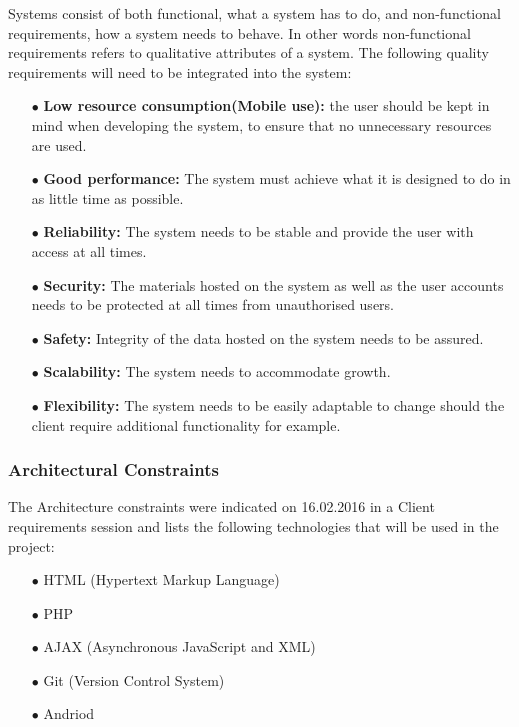 \documentclass[a4paper,12pt]{article}
\begin{document}
\begin{flushleft}
Systems consist of both functional, what a system has to do, and non-functional requirements, how a system needs to behave. In other words non-functional requirements refers to qualitative attributes of a system. The following quality requirements will need to be integrated into the system:
\begin{itemize}
	\item[$\bullet$]\textbf{Low resource consumption(Mobile use): } the user should be kept in mind when developing the system, to ensure that no unnecessary resources are used.
	\item[$\bullet$]\textbf{Good performance: }The system must achieve what it is designed to do in as little time as possible.
	\item[$\bullet$]\textbf{Reliability: }The system needs to be stable and provide the user with access at all times.
	\item[$\bullet$]\textbf{Security: }The materials hosted on the system as well as the user accounts needs to be protected at all times from unauthorised users.
	\item[$\bullet$]\textbf{Safety: }Integrity of the data hosted on the system needs to be assured.
	\item[$\bullet$]\textbf{Scalability: }The system needs to accommodate growth.
	\item[$\bullet$]\textbf{Flexibility: }The system needs to be easily adaptable to change should the client require additional functionality for example.
\end{itemize}
\end{flushleft}

\subsubsection{Architectural Constraints}
The Architecture constraints were indicated on 16.02.2016 in a Client requirements session and lists the following technologies that will be used in the project:
\begin{itemize}
	\item[$\bullet$]HTML (Hypertext Markup Language) 
	\item[$\bullet$]PHP
	\item[$\bullet$]AJAX (Asynchronous JavaScript and XML)
	\item[$\bullet$]Git (Version Control System)
	\item[$\bullet$]Andriod
	\\
\end{itemize}
\end{document}
